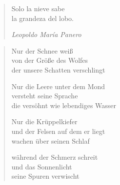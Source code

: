 

\begin{quote}
Solo la nieve sabe\\
la grandeza del lobo.

\hspace{2em}\textit{Leopoldo María Panero}
\end{quote}

\begin{verse}
Nur der Schnee weiß\\
von der Größe des Wolfes\\
der unsere Schatten verschlingt

Nur die Leere unter dem Mond\\
versteht seine Sprache\\
die versöhnt wie lebendiges Wasser

Nur die Krüppelkiefer\\
und der Felsen auf dem er liegt\\
wachen über seinen Schlaf

während der Schmerz schreit\\
und das Sonnenlicht\\
seine Spuren verwischt
\end{verse}
